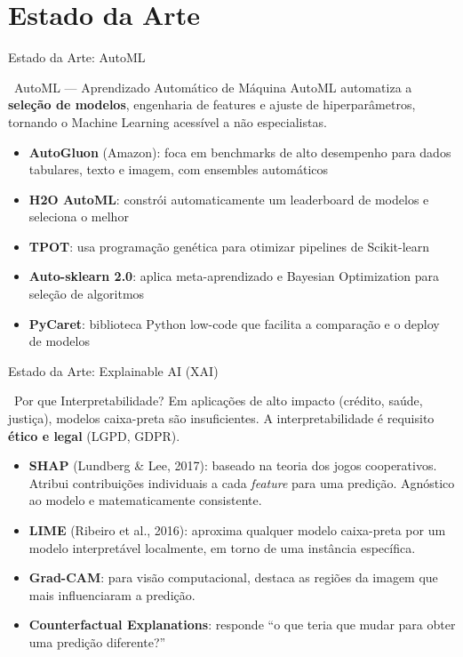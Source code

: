 \documentclass[aspectratio=169]{beamer}
\begin{document}
\section{Estado da Arte}

\begin{frame}{Estado da Arte: AutoML}
    \begin{block}{\faCogs\ AutoML --- Aprendizado Automático de Máquina}
        AutoML automatiza a \textbf{seleção de modelos}, engenharia de features e ajuste de hiperparâmetros, tornando o Machine Learning acessível a não especialistas.
    \end{block}
    \vspace{0.2cm}
    \begin{itemize}
        \item \textbf{AutoGluon} (Amazon): foca em benchmarks de alto desempenho para dados tabulares, texto e imagem, com ensembles automáticos
        \item \textbf{H2O AutoML}: constrói automaticamente um leaderboard de modelos e seleciona o melhor
        \item \textbf{TPOT}: usa programação genética para otimizar pipelines de Scikit-learn
        \item \textbf{Auto-sklearn 2.0}: aplica meta-aprendizado e Bayesian Optimization para seleção de algoritmos
        \item \textbf{PyCaret}: biblioteca Python low-code que facilita a comparação e o deploy de modelos
    \end{itemize}
\end{frame}

\begin{frame}{Estado da Arte: Explainable AI (XAI)}
    \begin{block}{\faEye\ Por que Interpretabilidade?}
        Em aplicações de alto impacto (crédito, saúde, justiça), modelos caixa-preta são insuficientes. A interpretabilidade é requisito \textbf{ético e legal} (LGPD, GDPR).
    \end{block}
    \vspace{0.2cm}
    \begin{itemize}
        \item \textbf{SHAP} (Lundberg \& Lee, 2017): baseado na teoria dos jogos cooperativos. Atribui contribuições individuais a cada \textit{feature} para uma predição. Agnóstico ao modelo e matematicamente consistente.
        \item \textbf{LIME} (Ribeiro et al., 2016): aproxima qualquer modelo caixa-preta por um modelo interpretável localmente, em torno de uma instância específica.
        \item \textbf{Grad-CAM}: para visão computacional, destaca as regiões da imagem que mais influenciaram a predição.
        \item \textbf{Counterfactual Explanations}: responde ``o que teria que mudar para obter uma predição diferente?''
    \end{itemize}
\end{frame}
\end{document}
